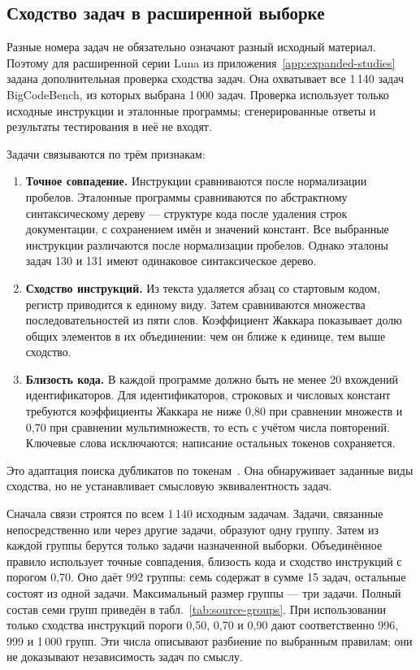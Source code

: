 \subsection{Сходство задач в расширенной выборке}
Разные номера задач не обязательно означают разный исходный материал. Поэтому для расширенной серии Luna из приложения~\ref{app:expanded-studies} задана дополнительная проверка сходства задач. Она охватывает все 1\,140 задач BigCodeBench, из которых выбрана 1\,000 задач. Проверка использует только исходные инструкции и эталонные программы; сгенерированные ответы и результаты тестирования в неё не входят.

Задачи связываются по трём признакам:
\begin{enumerate}
\item \textbf{Точное совпадение.} Инструкции сравниваются после нормализации пробелов. Эталонные программы сравниваются по абстрактному синтаксическому дереву --- структуре кода после удаления строк документации, с сохранением имён и значений констант. Все выбранные инструкции различаются после нормализации пробелов. Однако эталоны задач 130 и 131 имеют одинаковое синтаксическое дерево.
\item \textbf{Сходство инструкций.} Из текста удаляется абзац со стартовым кодом, регистр приводится к единому виду. Затем сравниваются множества последовательностей из пяти слов. Коэффициент Жаккара показывает долю общих элементов в их объединении: чем он ближе к единице, тем выше сходство.
\item \textbf{Близость кода.} В каждой программе должно быть не менее 20 вхождений идентификаторов. Для идентификаторов, строковых и числовых констант требуются коэффициенты Жаккара не ниже 0,80 при сравнении множеств и 0,70 при сравнении мультимножеств, то есть с учётом числа повторений. Ключевые слова исключаются; написание остальных токенов сохраняется.
\end{enumerate}
Это адаптация поиска дубликатов по токенам~\cite{allamanis2019duplication}. Она обнаруживает заданные виды сходства, но не устанавливает смысловую эквивалентность задач.

Сначала связи строятся по всем 1\,140 исходным задачам. Задачи, связанные непосредственно или через другие задачи, образуют одну группу. Затем из каждой группы берутся только задачи назначенной выборки. Объединённое правило использует точные совпадения, близость кода и сходство инструкций с порогом 0,70. Оно даёт 992 группы: семь содержат в сумме 15 задач, остальные состоят из одной задачи. Максимальный размер группы --- три задачи. Полный состав семи групп приведён в табл.~\ref{tab:source-groups}. При использовании только сходства инструкций пороги 0,50, 0,70 и 0,90 дают соответственно 996, 999 и 1\,000 групп. Эти числа описывают разбиение по выбранным правилам; они не доказывают независимость задач по смыслу.

